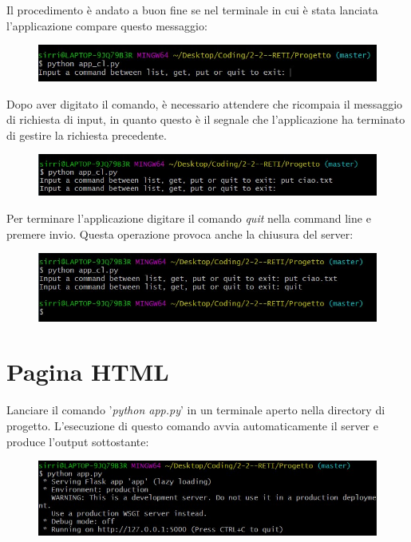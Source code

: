 \documentclass[a4paper,12pt]{report}
\begin{document}
Il procedimento è andato a buon fine se nel terminale in cui è stata lanciata l'applicazione compare questo messaggio:
\begin{figure}[H]
    \centering
    \includegraphics[width=\textwidth]{img/terminale.jpg}
\end{figure}

Dopo aver digitato il comando, è necessario attendere che ricompaia il messaggio di richiesta di input, in quanto questo è il segnale che l'applicazione ha terminato di gestire la richiesta precedente.
\begin{figure}[H]
    \centering
    \includegraphics[width=\textwidth]{img/terminale_1.jpg}
\end{figure}

Per terminare l'applicazione digitare il comando \textit{quit} nella command line e premere invio. Questa operazione provoca anche la chiusura del server:
\begin{figure}[H]
    \centering
    \includegraphics[width=\textwidth]{img/terminale_2.jpg}
\end{figure}

\section{Pagina HTML}
Lanciare il comando '\textit{python app.py}' in un terminale aperto nella directory di progetto. L'esecuzione di questo comando avvia automaticamente il server e produce l'output sottostante:
\begin{figure}[H]
    \centering
    \includegraphics[width=\textwidth]{img/gui.jpg}
\end{figure}
\end{document}

